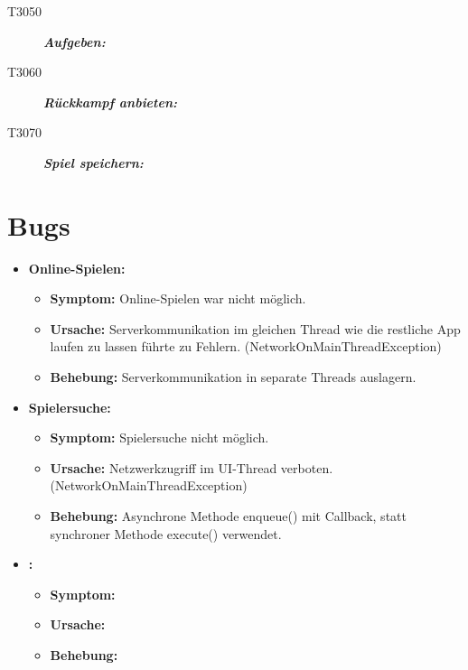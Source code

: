 \documentclass[parskip=full]{scrartcl}
\begin{document}
\begin{description}
	
	\item[T3050] \textbf{\textit{Aufgeben: }} 

	
	\item[T3060] \textbf{\textit{Rückkampf anbieten: }} 
	
	\item[T3070] \textbf{\textit{Spiel speichern: }} 
	
	
\end{description}

\section{Bugs}
\begin{itemize}
\item{\textbf{Online-Spielen:}}
	\begin{itemize}
	\item{\textbf{Symptom:}} Online-Spielen war nicht möglich.
	\item{\textbf{Ursache:}} Serverkommunikation im gleichen Thread wie die restliche App laufen zu 	lassen führte zu Fehlern. (NetworkOnMainThreadException)
	\item{\textbf{Behebung:}} Serverkommunikation in separate Threads auslagern.
	\end{itemize}
\item{\textbf{Spielersuche:}}
	\begin{itemize}
	\item{\textbf{Symptom:}} Spielersuche nicht möglich.
	\item{\textbf{Ursache:}} Netzwerkzugriff im UI-Thread verboten. (NetworkOnMainThreadException)
	\item{\textbf{Behebung:}} Asynchrone Methode enqueue() mit Callback, statt synchroner Methode execute() verwendet.
	\end{itemize}
\item{\textbf{:}}
	\begin{itemize}
	\item{\textbf{Symptom:}}
	\item{\textbf{Ursache:}}
	\item{\textbf{Behebung:}}
	\end{itemize}
\end{itemize}
\end{document}
